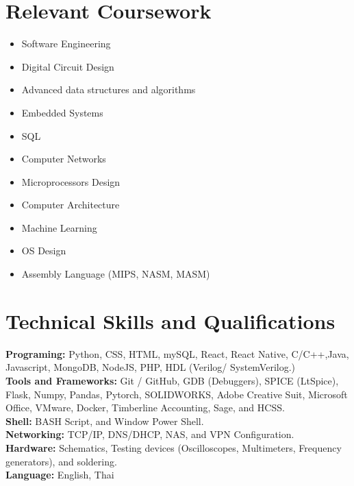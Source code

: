 \documentclass[letterpaper,11pt]{article}
\newcommand{\resumeSubHeadingListStart}{\begin{itemize}[leftmargin=0.0in, label={}]}
\newcommand{\resumeSubHeadingListEnd}{\end{itemize}}
\begin{document}
\section{Relevant Coursework}
    \begin{multicols}{4}
        \begin{itemize}[itemsep=-1pt, parsep=3pt]
            \item \small Software Engineering
            \item \small Digital Circuit Design 
            \item \small Advanced data structures and algorithms
            \item \small Embedded Systems
            \item \small SQL 
            \item \small Computer Networks
            \item \small Microprocessors Design
            \item \small Computer Architecture
            \item \small Machine Learning
            \item \small OS Design
            \item \small Assembly Language (MIPS, NASM, MASM)
        \end{itemize}
    \end{multicols}
    \vspace*{1.5\multicolsep}
\vspace{8pt}


\section{Technical Skills and Qualifications }
\begin{itemize}[left=0.15in, label={}]
    \small{
    \item \textbf{Programing:} Python, CSS, HTML, mySQL, React, React Native, C/C++,Java, Javascript, MongoDB, NodeJS, PHP, 
    HDL (Verilog/ SystemVerilog.) \\
    \textbf{Tools and Frameworks:} Git / GitHub, GDB (Debuggers), SPICE (LtSpice), Flask, Numpy, Pandas, Pytorch, SOLIDWORKS, Adobe Creative Suit, Microsoft Office, VMware, Docker, Timberline Accounting, Sage, and HCSS. \\
    \textbf{Shell:} BASH Script, and Window Power Shell. \\
    \textbf{Networking:} TCP/IP, DNS/DHCP, NAS, and VPN Configuration. \\
    \textbf{Hardware:} Schematics, Testing devices (Oscilloscopes, Multimeters, Frequency generators), and soldering. \\
    \textbf{Language:} English, Thai \\
    }
\end{itemize}
\vspace{-15pt}
\end{document}
